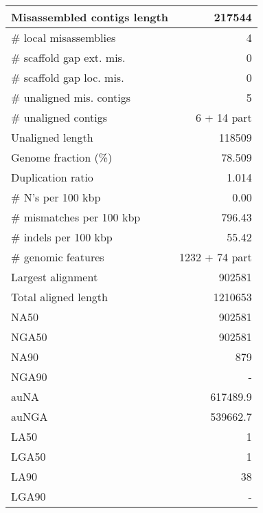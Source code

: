 \documentclass[12pt,a4paper]{article}
\begin{document}
\begin{table}[ht]
\begin{center}
\begin{tabular}{|l*{1}{|r}|}
Misassembled contigs length & 217544 \\ \hline
\# local misassemblies & 4 \\ \hline
\# scaffold gap ext. mis. & 0 \\ \hline
\# scaffold gap loc. mis. & 0 \\ \hline
\# unaligned mis. contigs & 5 \\ \hline
\# unaligned contigs & 6 + 14 part \\ \hline
Unaligned length & 118509 \\ \hline
Genome fraction (\%) & 78.509 \\ \hline
Duplication ratio & 1.014 \\ \hline
\# N's per 100 kbp & 0.00 \\ \hline
\# mismatches per 100 kbp & 796.43 \\ \hline
\# indels per 100 kbp & 55.42 \\ \hline
\# genomic features & 1232 + 74 part \\ \hline
Largest alignment & 902581 \\ \hline
Total aligned length & 1210653 \\ \hline
NA50 & 902581 \\ \hline
NGA50 & 902581 \\ \hline
NA90 & 879 \\ \hline
NGA90 & - \\ \hline
auNA & 617489.9 \\ \hline
auNGA & 539662.7 \\ \hline
LA50 & 1 \\ \hline
LGA50 & 1 \\ \hline
LA90 & 38 \\ \hline
LGA90 & - \\ \hline
\end{tabular}
\end{center}
\end{table}
\end{document}

